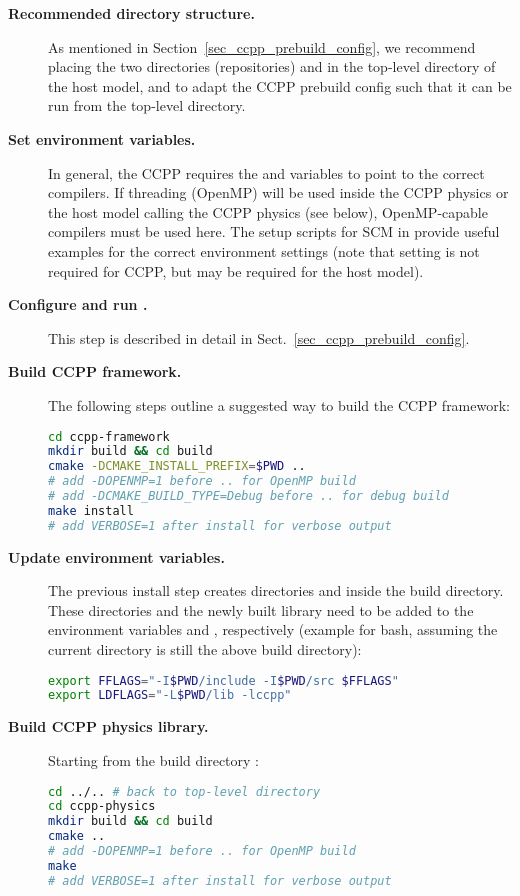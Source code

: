 \begin{description}
\item[\textbf{Recommended directory structure.}] As mentioned in Section~\ref{sec_ccpp_prebuild_config}, we recommend placing the two directories (repositories)  and  in the top-level directory of the host model, and to adapt the CCPP prebuild config such that it can be run from the top-level directory.
\item[\textbf{Set environment variables.}] In general, the CCPP requires the  and  variables to point to the correct compilers. If threading (OpenMP) will be used inside the CCPP physics or the host model calling the CCPP physics (see below), OpenMP-capable compilers must be used here. The setup scripts for SCM in  provide useful examples for the correct environment settings (note that setting  is not required for CCPP, but may be required for the host model).
\item[\textbf{Configure and run .}] This step is described in detail in Sect.~\ref{sec_ccpp_prebuild_config}.
\item[\textbf{Build CCPP framework.}] The following steps outline a suggested way to build the CCPP framework:
\begin{lstlisting}[language=bash]
cd ccpp-framework
mkdir build && cd build
cmake -DCMAKE_INSTALL_PREFIX=$PWD ..
# add -DOPENMP=1 before .. for OpenMP build
# add -DCMAKE_BUILD_TYPE=Debug before .. for debug build
make install
# add VERBOSE=1 after install for verbose output
\end{lstlisting}
\item[\textbf{Update environment variables.}] The previous install step creates directories  and  inside the build directory. These directories and the newly built library  need to be added to the environment variables  and , respectively (example for bash, assuming the current directory is still the above build directory):
\begin{lstlisting}[language=bash]
export FFLAGS="-I$PWD/include -I$PWD/src $FFLAGS"
export LDFLAGS="-L$PWD/lib -lccpp"
\end{lstlisting}
\item[\textbf{Build CCPP physics library.}] Starting from the build directory :
\begin{lstlisting}[language=bash]
cd ../.. # back to top-level directory
cd ccpp-physics
mkdir build && cd build
cmake ..
# add -DOPENMP=1 before .. for OpenMP build
make
# add VERBOSE=1 after install for verbose output
\end{lstlisting}
\end{description}
